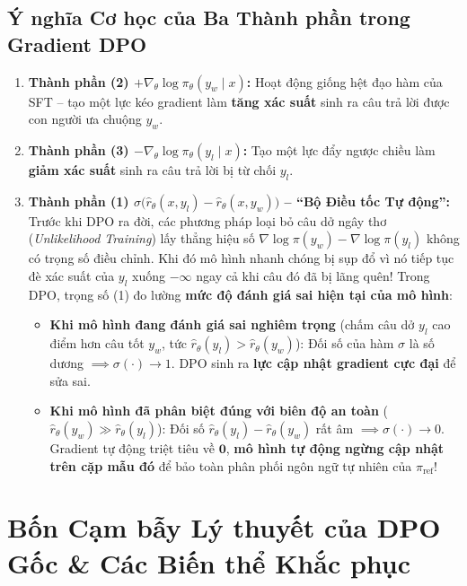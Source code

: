 \subsection{Ý nghĩa Cơ học của Ba Thành phần trong Gradient DPO}
\begin{enumerate}[leftmargin=1.2cm]
    \item \textbf{Thành phần (2) $+\nabla_\theta \log \pi_\theta(y_w \mid x)$:} Hoạt động giống hệt đạo hàm của SFT -- tạo một lực kéo gradient làm \textbf{tăng xác suất} sinh ra câu trả lời được con người ưa chuộng $y_w$.
    \item \textbf{Thành phần (3) $-\nabla_\theta \log \pi_\theta(y_l \mid x)$:} Tạo một lực đẩy ngược chiều làm \textbf{giảm xác suất} sinh ra câu trả lời bị từ chối $y_l$.
    \item \textbf{Thành phần (1) $\sigma\big(\hat{r}_\theta(x, y_l) - \hat{r}_\theta(x, y_w)\big)$ -- ``Bộ Điều tốc Tự động'':}
    Trước khi DPO ra đời, các phương pháp loại bỏ câu dở ngây thơ (\textit{Unlikelihood Training}) lấy thẳng hiệu số $\nabla \log \pi(y_w) - \nabla \log \pi(y_l)$ không có trọng số điều chỉnh. Khi đó mô hình nhanh chóng bị sụp đổ vì nó tiếp tục đè xác suất của $y_l$ xuống $-\infty$ ngay cả khi câu đó đã bị lãng quên!
    Trong DPO, trọng số (1) đo lường \textbf{mức độ đánh giá sai hiện tại của mô hình}:
    \begin{itemize}
        \item \textbf{Khi mô hình đang đánh giá sai nghiêm trọng} (chấm câu dở $y_l$ cao điểm hơn câu tốt $y_w$, tức $\hat{r}_\theta(y_l) > \hat{r}_\theta(y_w)$): Đối số của hàm $\sigma$ là số dương $\implies \sigma(\cdot) \to 1$. DPO sinh ra \textbf{lực cập nhật gradient cực đại} để sửa sai.
        \item \textbf{Khi mô hình đã phân biệt đúng với biên độ an toàn} ($\hat{r}_\theta(y_w) \gg \hat{r}_\theta(y_l)$): Đối số $\hat{r}_\theta(y_l) - \hat{r}_\theta(y_w)$ rất âm $\implies \sigma(\cdot) \to 0$. Gradient tự động triệt tiêu về $\mathbf{0}$, \textbf{mô hình tự động ngừng cập nhật trên cặp mẫu đó} để bảo toàn phân phối ngôn ngữ tự nhiên của $\pi_{\text{ref}}$!
    \end{itemize}
\end{enumerate}

\section{Bốn Cạm bẫy Lý thuyết của DPO Gốc \& Các Biến thể Khắc phục}
\label{sec:dpo_failure_modes}

